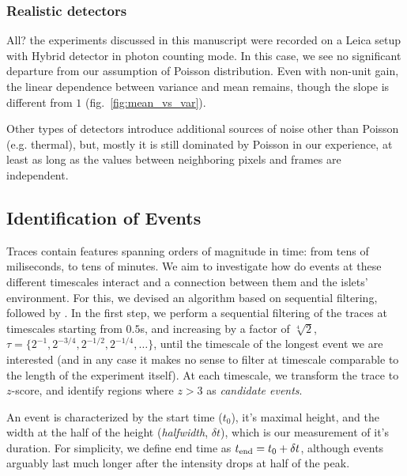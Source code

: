 \documentclass[a4paper,11pt,oneside,]{article}
\begin{document}
\subsubsection{Realistic detectors}
All{\color{red}?} the experiments discussed in this manuscript were recorded on a Leica setup with Hybrid detector in photon counting mode.
In this case, we see no significant departure from our assumption of Poisson distribution.
Even with non-unit gain, the linear dependence between variance and mean remains, though the slope is different from $1$ (fig.~\ref{fig:mean_vs_var}).

Other types of detectors introduce additional sources of noise other than Poisson (e.g. thermal), but, mostly it is still dominated by Poisson in our experience, at least as long as the values between neighboring pixels and frames are independent.


\subsection{Identification of Events}

Traces contain features spanning orders of magnitude in time: from tens of miliseconds, to tens of minutes. 
We aim to investigate how do events at these different timescales interact and a connection between them and the islets' environment.
For this, we devised an algorithm based on sequential filtering, followed by .
In the first step, we perform a sequential filtering of the traces at timescales starting from $0.5$s, and increasing by a factor of $\sqrt[4]{2}$,  $\tau = \{2^{-1}, 2^{-3/4}, 2^{-1/2}, 2^{-1/4},\dots\}$, until the timescale of the longest event we are interested (and in any case it makes no sense to filter at timescale comparable to the length of the experiment itself).
At each timescale, we transform the trace to $z$-score, and identify regions where $z>3$ as {\it candidate events}. 

An event is characterized by the start time ($t_0$), it's maximal height, and the width at the half of the height ({\it halfwidth}, $\delta t$), which is our measurement of it's duration.
For simplicity, we define end time as $t_{\rm end} = t_0+\delta t$, although events arguably last much longer after the intensity drops at half of the peak.
\end{document}

